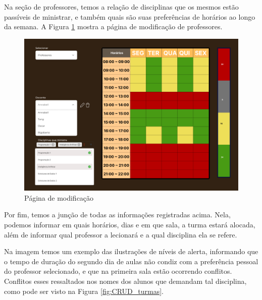 Na seção de professores, temos a relação de disciplinas que os mesmos estão passíveis de ministrar, e também quais são suas preferências de horários ao longo da semana. A Figura \ref{fig:CRUD_professores} mostra a página de modificação de professores.

\begin{figure}[htbp]\centering
  \caption{\label{fig:CRUD_professores} Página de modificação}
  \includegraphics[scale=0.6]{files/img/Prototipo/Medio/CRUD_professores.png}
\end{figure} %

Por fim, temos a junção de todas as informações registradas acima. Nela, podemos informar em quais horários, dias e em que sala, a turma estará alocada, além de informar qual professor a lecionará e a qual disciplina ela se refere.

Na imagem temos um exemplo das ilustrações de níveis de alerta, informando que o tempo de duração do segundo dia de aulas não condiz com a preferência pessoal do professor selecionado, e que na primeira sala estão ocorrendo conflitos. Conflitos esses ressaltados nos nomes dos alunos que demandam tal disciplina, como pode ser visto na Figura \ref{fig:CRUD_turmas}.

